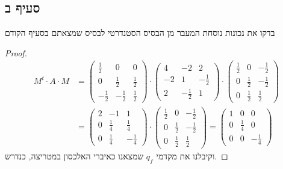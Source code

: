 \documentclass{article}
\begin{document}
    \subsection*{סעיף ב}
    בדקו את נכונות נוסחת המעבר מן הבסיס הסטנדרטי לבסיס שמצאתם בסעיף הקודם
    \begin{proof}
        \begin{align*}
        M^t \cdot A \cdot M &=
        \begin{pmatrix}
            \frac{1}{2} & 0 & 0 \\
            0 & \frac{1}{2} & \frac{1}{2} \\
            -\frac{1}{2} & -\frac{1}{2} & \frac{1}{2}
        \end{pmatrix} \cdot
        \begin{pmatrix}
            4 & -2 & 2 \\
            -2 & 1 & -\frac{1}{2} \\
            2 & -\frac{1}{2} & 1
        \end{pmatrix} \cdot
        \begin{pmatrix}
            \frac{1}{2} & 0 & - \frac{1}{2} \\
            0 & \frac{1}{2} & - \frac{1}{2} \\
            0 & \frac{1}{2} & \frac{1}{2}
        \end{pmatrix} \\
        &=
        \begin{pmatrix}
            2 & -1 & 1 \\
            0 & \frac{1}{4} & \frac{1}{4} \\
            0 & \frac{1}{4} & - \frac{1}{4}
            \end{pmatrix}\cdot
            \begin{pmatrix}
                \frac{1}{2} & 0 & - \frac{1}{2} \\
                0 & \frac{1}{2} & - \frac{1}{2} \\
                0 & \frac{1}{2} & \frac{1}{2}
            \end{pmatrix}
            =
            \begin{pmatrix}
                1 & 0 & 0 \\
                0 &  \frac{1}{4} & 0 \\
                0 & 0 & -\frac{1}{4}
            \end{pmatrix}
        \end{align*}
        וקיבלנו את מקדמי $q_f$ שמצאנו כאיברי האלכסון במטריצה, כנדרש.
    \end{proof}
\end{document}
